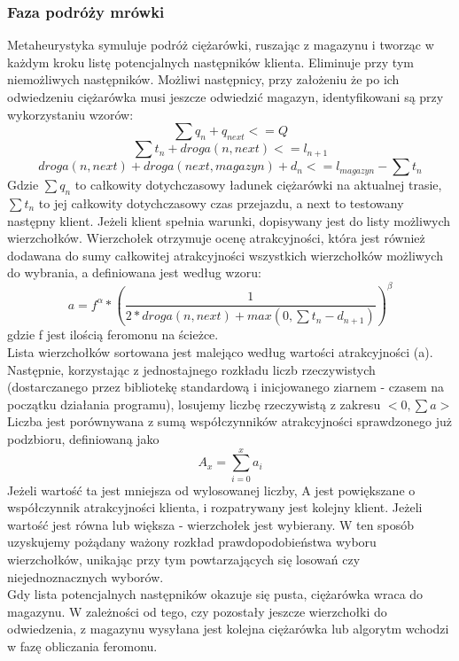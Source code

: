 \documentclass[a4paper]{article}
\begin{document}
\subsubsection{Faza podróży mrówki}
Metaheurystyka symuluje podróż ciężarówki, ruszając z magazynu i tworząc w każdym kroku listę potencjalnych następników klienta. Eliminuje przy tym niemożliwych następników. Możliwi następnicy, przy założeniu że po ich odwiedzeniu ciężarówka musi jeszcze odwiedzić magazyn, identyfikowani są przy wykorzystaniu wzorów:
$$\sum q_n + q_{next} <= Q$$
$$\sum t_n + droga(n, next) <= l_{n+1}$$
$$droga(n, next) + droga(next, magazyn) + d_n <= l_{magazyn} - \sum t_n$$
Gdzie $\sum q_n$ to całkowity dotychczasowy ładunek ciężarówki na aktualnej trasie, $\sum t_n$ to jej całkowity dotychczasowy czas przejazdu, a next to testowany następny klient. Jeżeli klient spełnia warunki, dopisywany jest do listy możliwych wierzchołków. Wierzchołek otrzymuje ocenę atrakcyjności, która jest również dodawana do sumy całkowitej atrakcyjności wszystkich wierzchołków możliwych do wybrania, a definiowana jest według wzoru:
$$ a = f^\alpha * (\frac{1}{2*droga(n, next) + max(0, \sum t_n - d_{n+1})})^\beta $$
gdzie f jest ilością feromonu na ścieżce.\\
Lista wierzchołków sortowana jest malejąco według wartości atrakcyjności (a). Następnie, korzystając z jednostajnego rozkładu liczb rzeczywistych (dostarczanego przez bibliotekę standardową i inicjowanego ziarnem - czasem na początku działania programu), losujemy liczbę rzeczywistą z zakresu $<0, \sum a>$ Liczba jest porównywana z sumą współczynników atrakcyjności sprawdzonego już podzbioru, definiowaną jako $$ A_x = \sum_{i=0}^x a_i $$
Jeżeli wartość ta jest mniejsza od wylosowanej liczby, A jest powiększane o współczynnik atrakcyjności klienta, i rozpatrywany jest kolejny klient. Jeżeli wartość jest równa lub większa - wierzchołek jest wybierany. W ten sposób uzyskujemy pożądany ważony rozkład prawdopodobieństwa wyboru wierzchołków, unikając przy tym powtarzających się losowań czy niejednoznacznych wyborów.\\
Gdy lista potencjalnych następników okazuje się pusta, ciężarówka wraca do magazynu. W zależności od tego, czy pozostały jeszcze wierzchołki do odwiedzenia, z magazynu wysyłana jest kolejna ciężarówka lub algorytm wchodzi w fazę obliczania feromonu.
\end{document}
